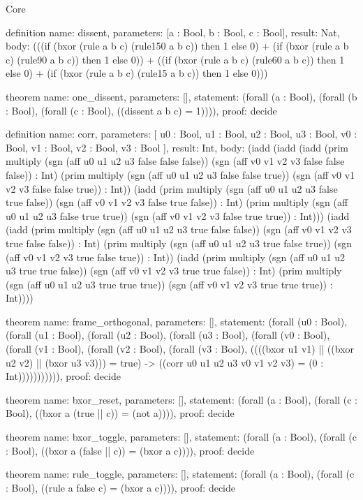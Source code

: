 \begin{lexlean}{Core}
\begin{semanticmodule}
definition{
  name: dissent,
  parameters: [a : Bool, b : Bool, c : Bool],
  result: Nat,
  body: (((if (bxor (rule a b c) (rule150 a b c)) then 1 else 0) + (if (bxor (rule a b c) (rule90 a b c)) then 1 else 0)) + ((if (bxor (rule a b c) (rule60 a b c)) then 1 else 0) + (if (bxor (rule a b c) (rule15 a b c)) then 1 else 0)))
}

theorem{
  name: one_dissent,
  parameters: [],
  statement: (forall (a : Bool), (forall (b : Bool), (forall (c : Bool), ((dissent a b c) = 1)))),
  proof: decide{}
}

definition{
  name: corr,
  parameters: [
    u0 : Bool,
    u1 : Bool,
    u2 : Bool,
    u3 : Bool,
    v0 : Bool,
    v1 : Bool,
    v2 : Bool,
    v3 : Bool
  ],
  result: Int,
  body: (iadd (iadd (iadd (prim multiply (sgn (aff u0 u1 u2 u3 false false false)) (sgn (aff v0 v1 v2 v3 false false false)) : Int) (prim multiply (sgn (aff u0 u1 u2 u3 false false true)) (sgn (aff v0 v1 v2 v3 false false true)) : Int)) (iadd (prim multiply (sgn (aff u0 u1 u2 u3 false true false)) (sgn (aff v0 v1 v2 v3 false true false)) : Int) (prim multiply (sgn (aff u0 u1 u2 u3 false true true)) (sgn (aff v0 v1 v2 v3 false true true)) : Int))) (iadd (iadd (prim multiply (sgn (aff u0 u1 u2 u3 true false false)) (sgn (aff v0 v1 v2 v3 true false false)) : Int) (prim multiply (sgn (aff u0 u1 u2 u3 true false true)) (sgn (aff v0 v1 v2 v3 true false true)) : Int)) (iadd (prim multiply (sgn (aff u0 u1 u2 u3 true true false)) (sgn (aff v0 v1 v2 v3 true true false)) : Int) (prim multiply (sgn (aff u0 u1 u2 u3 true true true)) (sgn (aff v0 v1 v2 v3 true true true)) : Int))))
}

theorem{
  name: frame_orthogonal,
  parameters: [],
  statement: (forall (u0 : Bool), (forall (u1 : Bool), (forall (u2 : Bool), (forall (u3 : Bool), (forall (v0 : Bool), (forall (v1 : Bool), (forall (v2 : Bool), (forall (v3 : Bool), ((((bxor u1 v1) || ((bxor u2 v2) || (bxor u3 v3))) = true) -> ((corr u0 u1 u2 u3 v0 v1 v2 v3) = (0 : Int))))))))))),
  proof: decide{}
}

theorem{
  name: bxor_reset,
  parameters: [],
  statement: (forall (a : Bool), (forall (c : Bool), ((bxor a (true || c)) = (not a)))),
  proof: decide{}
}

theorem{
  name: bxor_toggle,
  parameters: [],
  statement: (forall (a : Bool), (forall (c : Bool), ((bxor a (false || c)) = (bxor a c)))),
  proof: decide{}
}

theorem{
  name: rule_toggle,
  parameters: [],
  statement: (forall (a : Bool), (forall (c : Bool), ((rule a false c) = (bxor a c)))),
  proof: decide{}
}


\end{semanticmodule}
\end{lexlean}
